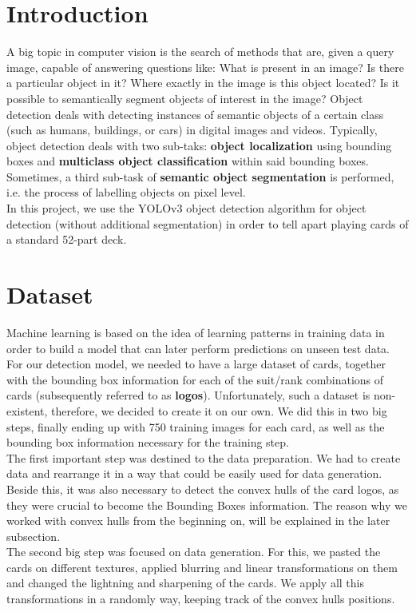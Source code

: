 \documentclass[a4paper]{article}
\begin{document}
\section{Introduction}
A big topic in computer vision is the search of methods that are, given a query image, capable of answering questions like: What is present in an image? Is there a particular object in it? Where exactly in the image is this object located? Is it possible to semantically segment objects of interest in the image?
Object detection deals with detecting instances of semantic objects of a certain class (such as humans, buildings, or cars) in digital images and videos. Typically, object detection deals with two sub-taks: \textbf{object localization} using bounding boxes and \textbf{multiclass object classification} within said bounding boxes.
Sometimes, a third sub-task of \textbf{semantic object segmentation} is performed, i.e. the process of labelling objects on pixel level.\\
In this project, we use the YOLOv3 object detection algorithm \cite{DBLP:journals/corr/abs-1804-02767} for object detection (without additional segmentation) in order to tell apart playing cards of a standard 52-part deck.

\section{Dataset}
Machine learning is based on the idea of learning patterns in training data in order to build a model that can later perform predictions on unseen test data. For our detection model, we needed to have a large dataset of cards, together with the bounding box information for each of the suit/rank combinations of cards (subsequently referred to as \textbf{logos}).  Unfortunately, such a dataset is non-existent, therefore, we decided to create it on our own.  We did this in two big steps, finally ending up with 750 training images for each card, as well as the bounding box information necessary for the training step.   \\
The first important step was destined to the data preparation.  We had to create data and rearrange it in a way that could be easily used for data generation.  Beside this, it was also necessary to detect the convex hulls of the card logos, as they were crucial to become the Bounding Boxes information.  The reason why we worked with convex hulls from the beginning on, will be explained in the later subsection.\\
The second big step was focused on data generation.  For this, we pasted the cards on different textures, applied blurring and linear transformations on them and changed the lightning and sharpening of the cards.  We apply all this transformations in a randomly way, keeping track of the convex hulls positions.
\end{document}
